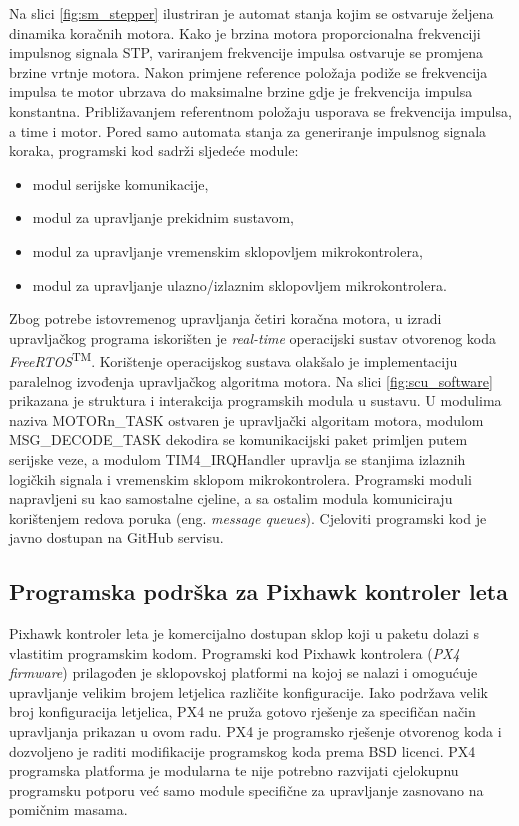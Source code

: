 \documentclass[11pt,a4paper]{article}
\begin{document}
Na slici \ref{fig:sm_stepper} ilustriran je automat stanja kojim se ostvaruje željena dinamika koračnih motora. Kako je brzina motora proporcionalna 
frekvenciji impulsnog signala STP, variranjem frekvencije impulsa ostvaruje se promjena brzine vrtnje motora. Nakon primjene reference položaja podiže se frekvencija impulsa te motor ubrzava do maksimalne brzine gdje je frekvencija impulsa konstantna. Približavanjem referentnom položaju usporava se frekvencija impulsa, a time i motor. \newline
Pored samo automata stanja za generiranje impulsnog signala koraka, programski kod sadrži sljedeće module:
\begin{itemize}
	\item modul serijske komunikacije,
	\item modul za upravljanje prekidnim sustavom,
	\item modul za upravljanje vremenskim sklopovljem mikrokontrolera,
	\item modul za upravljanje ulazno/izlaznim sklopovljem mikrokontrolera.
\end{itemize}
Zbog potrebe istovremenog upravljanja četiri koračna motora, u izradi upravljačkog programa iskorišten je \textit{real-time} operacijski sustav otvorenog koda \textit{FreeRTOS}\textsuperscript{TM}. Korištenje operacijskog sustava olakšalo je implementaciju paralelnog izvođenja upravljačkog algoritma motora. Na slici \ref{fig:scu_software} prikazana je struktura i interakcija programskih modula u sustavu. U modulima naziva MOTORn\_TASK
ostvaren je upravljački algoritam motora, modulom MSG\_DECODE\_TASK dekodira se komunikacijski paket primljen putem serijske veze, a modulom TIM4\_IRQHandler upravlja se stanjima izlaznih logičkih signala i vremenskim sklopom mikrokontrolera. Programski moduli napravljeni su kao samostalne
cjeline, a sa ostalim modula komuniciraju korištenjem redova poruka (eng. \textit{message queues}). Cjeloviti programski kod je javno dostupan na GitHub servisu. %

\subsection{Programska podrška za Pixhawk kontroler leta}
Pixhawk kontroler leta je komercijalno dostupan sklop koji u paketu dolazi s vlastitim programskim kodom. Programski kod Pixhawk kontrolera (\textit{PX4 firmware}) prilagođen je sklopovskoj platformi na kojoj se nalazi i omogućuje upravljanje velikim brojem letjelica različite konfiguracije. Iako podržava velik broj konfiguracija letjelica, PX4 ne pruža gotovo rješenje za specifičan način upravljanja prikazan u ovom radu. PX4 je programsko rješenje otvorenog koda i dozvoljeno je raditi modifikacije programskog koda prema BSD licenci. PX4 programska platforma je modularna te nije potrebno razvijati cjelokupnu programsku potporu već samo module specifične za upravljanje zasnovano na pomičnim masama.
\end{document}

